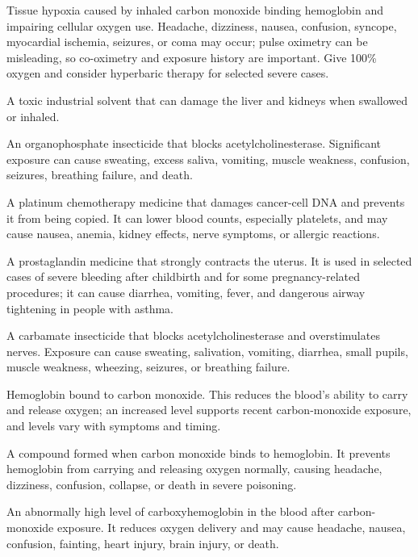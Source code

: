  Tissue hypoxia caused by inhaled carbon monoxide binding hemoglobin and impairing cellular oxygen use. Headache, dizziness, nausea, confusion, syncope, myocardial ischemia, seizures, or coma may occur; pulse oximetry can be misleading, so co-oximetry and exposure history are important. Give 100\% oxygen and consider hyperbaric therapy for selected severe cases.

 A toxic industrial solvent that can damage the liver and kidneys when swallowed or inhaled.

 An organophosphate insecticide that blocks acetylcholinesterase. Significant exposure can cause sweating, excess saliva, vomiting, muscle weakness, confusion, seizures, breathing failure, and death.

 A platinum chemotherapy medicine that damages cancer-cell DNA and prevents it from being copied. It can lower blood counts, especially platelets, and may cause nausea, anemia, kidney effects, nerve symptoms, or allergic reactions.

 A prostaglandin medicine that strongly contracts the uterus. It is used in selected cases of severe bleeding after childbirth and for some pregnancy-related procedures; it can cause diarrhea, vomiting, fever, and dangerous airway tightening in people with asthma.

 A carbamate insecticide that blocks acetylcholinesterase and overstimulates nerves. Exposure can cause sweating, salivation, vomiting, diarrhea, small pupils, muscle weakness, wheezing, seizures, or breathing failure.

 Hemoglobin bound to carbon monoxide. This reduces the blood's ability to carry and release oxygen; an increased level supports recent carbon-monoxide exposure, and levels vary with symptoms and timing.

 A compound formed when carbon monoxide binds to hemoglobin. It prevents hemoglobin from carrying and releasing oxygen normally, causing headache, dizziness, confusion, collapse, or death in severe poisoning.

 An abnormally high level of carboxyhemoglobin in the blood after carbon-monoxide exposure. It reduces oxygen delivery and may cause headache, nausea, confusion, fainting, heart injury, brain injury, or death.

